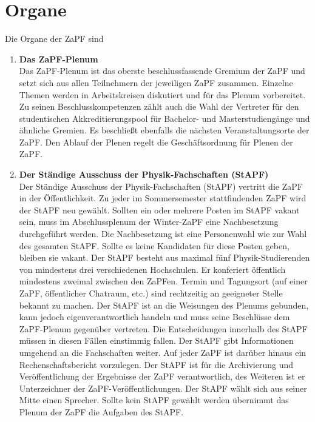 \documentclass[draft,12pt,oneside]{scrreprt}
\begin{document}
\section{Organe}
  Die Organe der ZaPF sind
  \begin{enumerate}
    \item \textbf{Das ZaPF-Plenum}\\
          Das ZaPF-Plenum ist das oberste beschlussfassende Gremium der ZaPF
          und setzt sich aus allen Teilnehmern der jeweiligen ZaPF zusammen.
          Einzelne Themen werden in Arbeits\-kreisen diskutiert und für das
          Plenum vorbereitet. Zu seinen Beschlusskompetenzen zählt auch die
          Wahl der Vertreter für den studentischen Akkreditierungspool für
          Bachelor- und Masterstudiengänge und ähnliche Gremien.  Es beschließt
          ebenfalls die nächsten Veranstaltungsorte der ZaPF.  Den Ablauf der
          Plenen regelt die Geschäftsordnung für Plenen der ZaPF.
    \item \textbf{Der Ständige Ausschuss der Physik-Fachschaften (StAPF)}\\
          Der Ständige Ausschuss der Physik-Fachschaften (StAPF) vertritt die
          ZaPF in der Öffentlichkeit. Zu jeder im Sommersemester stattfindenden
          ZaPF wird der StAPF neu gewählt. Sollten ein oder mehrere Posten im
          StAPF vakant sein, muss im Abschlussplenum der Winter-ZaPF eine
          Nachbesetzung durchgeführt werden. Die Nachbesetzung ist eine
          Personenwahl wie zur Wahl des gesamten StAPF. Sollte es keine
          Kandidaten für diese Posten geben, bleiben sie vakant. Der StAPF
          besteht aus maximal fünf Physik-Studierenden von mindestens drei
          verschiedenen Hochschulen. Er konferiert öffentlich mindestens
          zweimal zwischen den ZaPFen.  Termin und Tagungsort (auf einer ZaPF,
          öffentlicher Chatraum, etc.) sind rechtzeitig an geeigneter Stelle
          bekannt zu machen. Der StAPF ist an die Weisungen des Plenums
          gebunden, kann jedoch eigenverantwortlich handeln und muss seine
          Beschlüsse dem ZaPF-Plenum gegenüber vertreten. Die Entscheidungen
          innerhalb des StAPF müssen in diesen Fällen einstimmig fallen. Der
          StAPF gibt Informationen umgehend an die Fachschaften weiter.  Auf
          jeder ZaPF ist darüber hinaus ein Rechenschaftsbericht vorzulegen.
          Der StAPF ist für die Archivierung und Veröffentlichung der
          Ergebnisse der ZaPF verantwortlich, des Weiteren ist er Unterzeichner
          der ZaPF-Veröffentlichungen.  Der StAPF wählt sich aus seiner Mitte
          einen Sprecher. Sollte kein StAPF gewählt werden übernimmt das Plenum
          der ZaPF die Aufgaben des StAPF.
  \end{enumerate}
\end{document}
